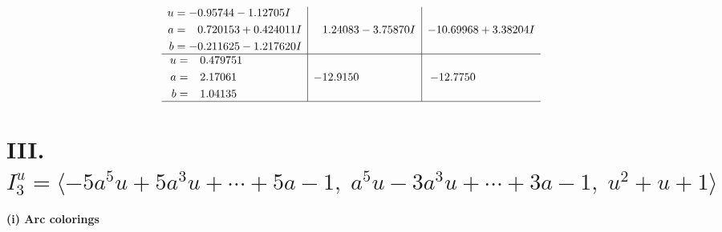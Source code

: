 \documentclass[1p]{elsarticle_modified}
\theoremstyle{definition}
\begin{document}
$$\begin{array}{c|c|c}
\begin{aligned}
u &= -0.95744 - 1.12705 I \\
a &= \phantom{-}0.720153 + 0.424011 I \\
b &= -0.211625 - 1.217620 I\end{aligned}
 & \phantom{-}1.24083 - 3.75870 I & -10.69968 + 3.38204 I \\ \hline\begin{aligned}
u &= \phantom{-}0.479751\phantom{ +0.000000I} \\
a &= \phantom{-}2.17061\phantom{ +0.000000I} \\
b &= \phantom{-}1.04135\phantom{ +0.000000I}\end{aligned}
 & -12.9150\phantom{ +0.000000I} & -12.7750\phantom{ +0.000000I}\\
 \hline 
 \end{array}$$\newpage\newpage\renewcommand{\arraystretch}{1}
\centering \section*{III. $I^u_{3}= \langle -5 a^5 u+5 a^3 u+\cdots+5 a-1,\;a^5 u-3 a^3 u+\cdots+3 a-1,\;u^2+u+1 \rangle$}
\flushleft \textbf{(i) Arc colorings}\\
\end{document}
